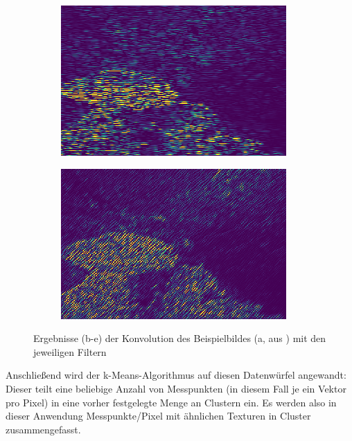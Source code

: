 \begin{figure}[H]
\begin{subfigure}{0.328\textwidth}
		\caption{}
	\end{subfigure}
	\begin{subfigure}{0.328\textwidth}
		\centering
		\includegraphics[width=\textwidth,keepaspectratio]{images/gen/GEN_tsugf_filterbank_101027_3.png}
		\caption{}
	\end{subfigure}
	\begin{subfigure}{0.328\textwidth}
		\centering
		\includegraphics[width=\textwidth,keepaspectratio]{images/gen/GEN_tsugf_filterbank_101027_4.png}
		\caption{}
	\end{subfigure}
	\caption{Ergebnisse (b-e) der Konvolution des Beispielbildes (a, aus \cite{bsd500}) mit den jeweiligen Filtern}
	\label{fig:tsugf_101027_raw}
\end{figure}

Anschließend wird der k-Means-Algorithmus auf diesen Datenwürfel angewandt: Dieser teilt eine beliebige Anzahl von Messpunkten (in diesem Fall je ein Vektor pro Pixel) in eine vorher festgelegte Menge an Clustern ein. Es werden also in dieser Anwendung Messpunkte/Pixel mit ähnlichen Texturen in Cluster zusammengefasst.


